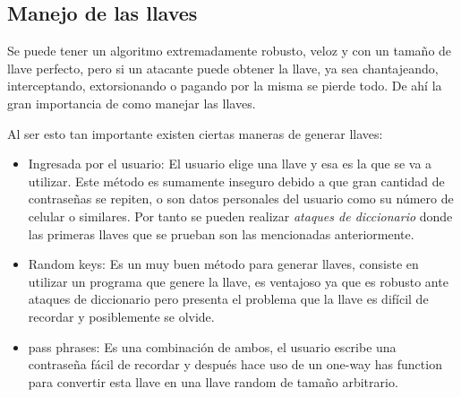 \subsection{Manejo de las llaves}
Se puede tener un algoritmo extremadamente robusto, veloz y con un tamaño de llave perfecto, pero si un atacante puede obtener la llave, ya sea chantajeando, interceptando, extorsionando o pagando por la misma se pierde todo. De ahí la gran importancia de como manejar las llaves.

Al ser esto tan importante existen ciertas maneras de generar llaves:
\begin{itemize}
\item Ingresada por el usuario: El usuario elige una llave y esa es la que se va a utilizar. Este método es sumamente inseguro
debido a que gran cantidad de contraseñas se repiten, o son datos personales del usuario como su número de celular o similares.
Por tanto se pueden realizar \textit{ataques de diccionario} donde las primeras llaves que se prueban son las mencionadas
anteriormente.

\item Random keys: Es un muy buen método para generar llaves, consiste en utilizar un programa que genere la llave, es ventajoso
ya que es robusto ante ataques de diccionario pero presenta el problema que la llave es difícil de recordar y posiblemente se olvide.

\item pass phrases: Es una combinación de ambos, el usuario escribe una contraseña fácil de recordar y después
hace uso de un one-way has function para convertir esta llave en una llave random de tamaño arbitrario.
\end{itemize}





